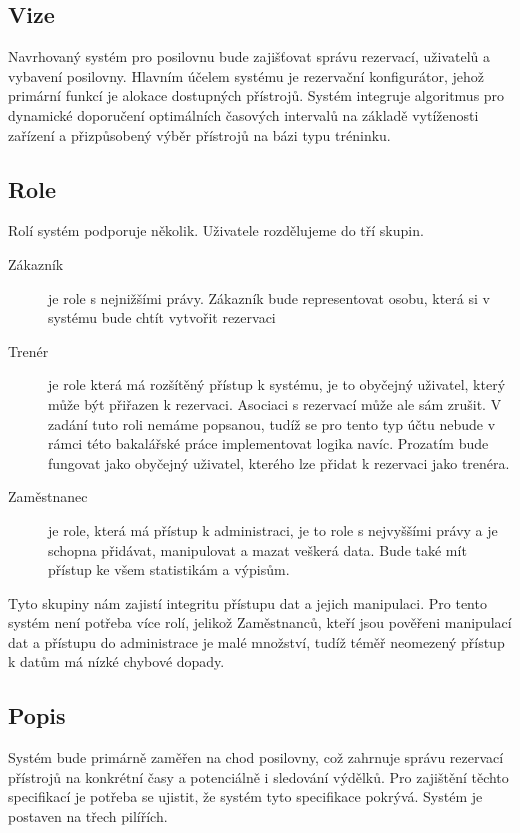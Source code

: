 
\subsection{Vize}
Navrhovaný systém pro posilovnu bude zajišťovat správu rezervací, uživatelů a vybavení posilovny. Hlavním účelem systému je rezervační konfigurátor, jehož primární funkcí je alokace dostupných přístrojů. Systém integruje algoritmus pro dynamické doporučení optimálních časových intervalů na základě vytíženosti zařízení a přizpůsobený výběr přístrojů na bázi typu tréninku.

\subsection{Role}
Rolí systém podporuje několik. Uživatele rozdělujeme do tří skupin.

\begin{description}
    \item[Zákazník] je role s nejnižšími právy. Zákazník bude representovat osobu, která si v systému bude chtít vytvořit rezervaci
    \item[Trenér] je role která má rozšítěný přístup k systému, je to obyčejný uživatel, který může být přiřazen k rezervaci. Asociaci s rezervací může ale sám zrušit. V zadání tuto roli nemáme popsanou, tudíž se pro tento typ účtu nebude v rámci této bakalářské práce implementovat logika navíc. Prozatím bude fungovat jako obyčejný uživatel, kterého lze přidat k rezervaci jako trenéra.
    \item[Zaměstnanec] je role, která má přístup k administraci, je to role s nejvyššími právy a je schopna přidávat, manipulovat a mazat veškerá data. Bude také mít přístup ke všem statistikám a výpisům.
\end{description}
Tyto skupiny nám zajistí integritu přístupu dat a jejich manipulaci. Pro tento systém není potřeba více rolí, jelikož Zaměstnanců, kteří jsou pověřeni manipulací dat a přístupu do administrace je malé množství, tudíž téměř neomezený přístup k datům má nízké chybové dopady.

\subsection{Popis}
Systém bude primárně zaměřen na chod posilovny, což zahrnuje správu rezervací přístrojů na konkrétní časy a potenciálně i sledování výdělků. Pro zajištění těchto specifikací je potřeba se ujistit, že systém tyto specifikace pokrývá. Systém je postaven na třech pilířích.

